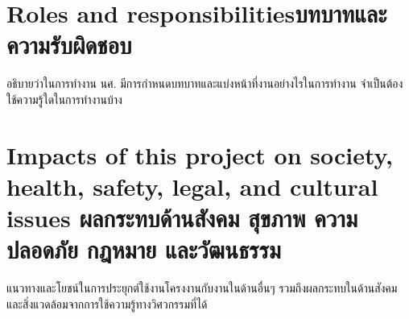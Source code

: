 \section{\ifenglish Roles and responsibilities\else บทบาทและความรับผิดชอบ\fi}
อธิบายว่าในการทำงาน นศ. มีการกำหนดบทบาทและแบ่งหน้าที่งานอย่างไรในการทำงาน จำเป็นต้องใช้ความรู้ใดในการทำงานบ้าง

\section{\ifenglish%
Impacts of this project on society, health, safety, legal, and cultural issues
\else%
ผลกระทบด้านสังคม สุขภาพ ความปลอดภัย กฎหมาย และวัฒนธรรม
\fi}

แนวทางและโยชน์ในการประยุกต์ใช้งานโครงงานกับงานในด้านอื่นๆ รวมถึงผลกระทบในด้านสังคมและสิ่งแวดล้อมจากการใช้ความรู้ทางวิศวกรรมที่ได้
